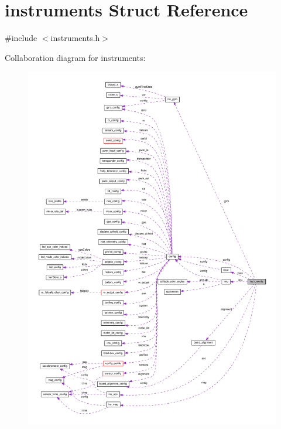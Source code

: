 \hypertarget{structinstruments}{\section{instruments Struct Reference}
\label{structinstruments}
}


{\ttfamily \#include $<$instruments.\+h$>$}



Collaboration diagram for instruments\+:\nopagebreak
\begin{figure}[H]
\begin{center}
\leavevmode
\includegraphics[width=350pt]{structinstruments__coll__graph}
\end{center}
\end{figure}
